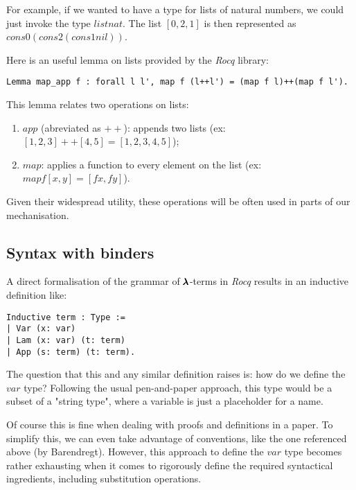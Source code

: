 For example, if we wanted to have a type for lists of natural numbers, we could just invoke the type \lst$list nat$.
The list \lst$[0,2,1]$ is then represented as \lst$cons 0 (cons 2 (cons 1 nil))$.

Here is an useful lemma on lists provided by the \textit{Rocq} library:
\begin{lstlisting}[language=Coq]
Lemma map_app f : forall l l', map f (l++l') = (map f l)++(map f l').
\end{lstlisting}

This lemma relates two operations on lists:
\begin{enumerate}
\item \lst$app$ (abreviated as \lst$++$): appends two lists (ex: \lst$[1,2,3]++[4,5] = [1,2,3,4,5]$);
\item \lst$map$: applies a function to every element on the list (ex: \lst$map f [x,y] = [f x, f y]$).
\end{enumerate}
Given their widespread utility, these operations will be often used in parts of our mechanisation.

\subsection{Syntax with binders}

A direct formalisation of the grammar of $\pmb{\lambda}$-terms in \textit{Rocq} results in an inductive definition like:
\begin{lstlisting}[language=Coq]
Inductive term : Type :=
| Var (x: var)
| Lam (x: var) (t: term)
| App (s: term) (t: term).
\end{lstlisting}

The question that this and any similar definition raises is: how do we define the \lst$var$ type? Following the usual pen-and-paper approach, this type would be a subset of a "string type", where a variable is just a placeholder for a name.

Of course this is fine when dealing with proofs and definitions in a paper.
To simplify this, we can even take advantage of conventions, like the one referenced above (by Barendregt).
However, this approach to define the \lst$var$ type becomes rather exhausting when it comes to rigorously define the required syntactical ingredients, including substitution operations.


